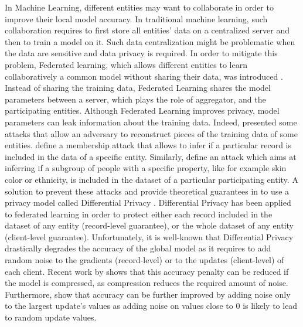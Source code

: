 \documentclass[accepted]{uai2021} %
\begin{document}
In Machine Learning, different entities may want to collaborate in order to improve their local model accuracy. In traditional machine learning, such collaboration requires to first store all entities' data on a centralized server and then to train a model on it. Such data centralization might be problematic when the data are sensitive and data privacy is required. In order to mitigate this problem, Federated learning, which allows different entities to learn collaboratively a common model without sharing their data, was introduced \citep{ShokriS15,FedAVG}.  Instead of sharing the training data, Federated Learning shares the model parameters between a server, which plays the role of aggregator, and the participating entities. Although Federated Learning improves privacy, model parameters can leak information about the training data. Indeed, \cite{ZhuLH19,idlg,geiping2020inverting} presented some attacks that allow an adversary to reconstruct pieces of the training data of some entities. \cite{NasrSH19} define a membership attack that allows to infer if a particular record is included in the data of a specific entity. Similarly,  \cite{Property_inference} define an attack which aims at inferring if a subgroup of people with a specific property, like for example skin color or ethnicity, is included in the dataset of a particular participating entity.  
A solution to prevent these attacks and provide theoretical guarantees in to use a privacy model called Differential Privacy \citep{Dwork2014book}. 
Differential Privacy has been applied to federated learning in order to protect either each record included in the dataset of any entity (record-level guarantee), or the whole dataset of any entity (client-level guarantee). Unfortunately, it is well-known that Differential Privacy drastically degrades the accuracy of the global model as it requires to add random noise to the gradients (record-level) or to the updates (client-level) of each client. Recent work  by \cite{our_cs} shows that this accuracy penalty can be reduced if the model is compressed, as compression reduces the required amount of noise. Furthermore, \cite{our_cs} show that accuracy can be further improved by adding noise only to the largest update's values as adding noise on values close to 0 is likely to lead to random update values.
\end{document}
